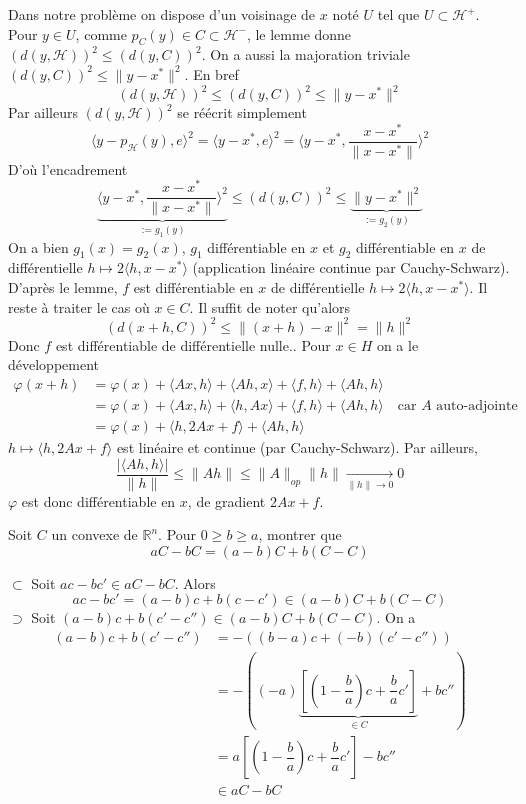 \documentclass{fancybook}
\begin{document}
Dans notre problème on dispose d'un voisinage de $x$ noté $U$ tel que $U\subset \mathcal H^+$. Pour $y\in U$, comme $p_C(y)\in C\subset \mathcal  H^-$, le lemme donne $(d(y,\mathcal H))^2\leq (d(y,C))^2$. On a aussi la majoration triviale $(d(y,C))^2\leq \|y-x^*\|^2$. En bref $$(d(y,\mathcal H))^2\leq (d(y,C))^2\leq \|y-x^*\|^2$$
Par ailleurs $(d(y,\mathcal H))^2$ se réécrit simplement $$\langle y-p_{\mathcal H}(y),e\rangle^2  = \langle y-x^*,e\rangle^2 = \langle y-x^*,\dfrac{x-x^*}{\|x-x^*\|}\rangle^2 $$
D'où l'encadrement $$\underbrace{\langle y-x^*,\dfrac{x-x^*}{\|x-x^*\|}\rangle^2}_{:= g_1(y)}\leq (d(y,C))^2\leq \underbrace{\|y-x^*\|^2}_{:= g_2(y)}$$
On a bien $g_1(x)=g_2(x)$, $g_1$ différentiable en $x$ et $g_2$ différentiable en $x$ de différentielle $h\mapsto 2\langle h,x-x^* \rangle$ (application linéaire continue par Cauchy-Schwarz).\newline
D'après le lemme, $f$ est différentiable en $x$ de différentielle $h\mapsto 2\langle h,x-x^* \rangle$.\newline \newline
Il reste à traiter le cas où $x\in C$. Il suffit de noter qu'alors $$(d(x+h,C))^2\leq \|(x+h)-x\|^2=\|h\|^2$$
Donc $f$ est différentiable de différentielle nulle.\newline {}. Pour $x\in H$ on a le développement 
$$\begin{aligned}
\varphi(x+h) &= \varphi(x) + \langle Ax,h\rangle + \langle Ah,x\rangle + \langle f,h\rangle + \langle Ah,h\rangle\\
&= \varphi(x) + \langle Ax,h\rangle + \langle h,Ax\rangle + \langle f,h\rangle + \langle Ah,h\rangle \quad \text{car }A \text{ auto-adjointe} \\
&= \varphi(x) + \langle h, 2Ax + f\rangle +\langle Ah,h\rangle
\end{aligned}$$
$h\mapsto \langle h, 2Ax + f\rangle$ est linéaire et continue (par Cauchy-Schwarz). Par ailleurs, $$\dfrac{|\langle Ah,h\rangle|}{\|h\|}\leq \|Ah\|\leq \|A\|_{op}\|h\| \xrightarrow[\|h\|\to 0]{} 0$$
$\varphi$ est donc différentiable en $x$, de gradient $2Ax + f$.

\begin{exercice}
Soit $C$ un convexe de $\mathbb R^n$. Pour $0\geq b \geq a$, montrer que $$aC-bC=(a-b)C+b(C-C)$$
\end{exercice}
$\subset$ Soit $ac-bc'\in aC-bC$. Alors  $$ac-bc'=(a-b)c+b(c-c')\in (a-b)C+b(C-C)$$ \newline \newline
$\supset$ Soit $(a-b)c+b(c'-c'')\in (a-b)C+b(C-C)$. On a
$$\begin{aligned}
(a-b)c+b(c'-c'') &= -\left( (b-a)c + (-b)(c'-c'') \right) \\
&= -\left( (-a)  \underbrace{\left[\left(1-\dfrac{b}{a}\right)c + \dfrac{b}{a}c'\right]}_{\in C}  + bc''\right) \\
&= a \left[\left(1-\dfrac{b}{a}\right)c + \dfrac{b}{a}c'\right] - b c''\\
&\in aC - bC
\end{aligned}$$
\end{document}
